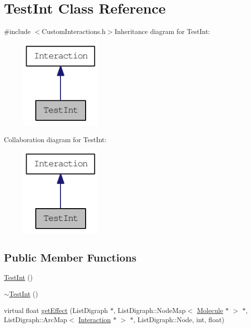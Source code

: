 \hypertarget{classTestInt}{
\section{TestInt Class Reference}
\label{classTestInt}
}


{\ttfamily \#include $<$CustomInteractions.h$>$}Inheritance diagram for TestInt:\nopagebreak
\begin{figure}[H]
\begin{center}
\leavevmode
\includegraphics[width=116pt]{classTestInt__inherit__graph}
\end{center}
\end{figure}
Collaboration diagram for TestInt:\nopagebreak
\begin{figure}[H]
\begin{center}
\leavevmode
\includegraphics[width=116pt]{classTestInt__coll__graph}
\end{center}
\end{figure}
\subsection*{Public Member Functions}
\begin{DoxyCompactItemize}
\item 
\hyperlink{classTestInt_ae60099905c20a07851e869710024f416}{TestInt} ()
\item 
\hyperlink{classTestInt_a3a50d31f6bc9d3e255fd6c4b6367c33d}{$\sim$TestInt} ()
\item 
virtual float \hyperlink{classTestInt_a7e6d8e60a2ebc357052a7776244893d7}{getEffect} (ListDigraph $\ast$, ListDigraph::NodeMap$<$ \hyperlink{classMolecule}{Molecule} $\ast$ $>$ $\ast$, ListDigraph::ArcMap$<$ \hyperlink{classInteraction}{Interaction} $\ast$ $>$ $\ast$, ListDigraph::Node, int, float)
\end{DoxyCompactItemize}


